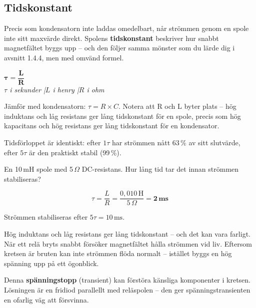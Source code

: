 \documentclass[a4paper,11pt,twoside]{book}
\newcommand{\emoji}[1]{{\emojifont #1}}
\begin{document}
\subsection{Tidskonstant}

Precis som kondensatorn inte laddas omedelbart, når 
strömmen genom en spole inte sitt maxvärde direkt. 
Spolens \textbf{tidskonstant} beskriver hur snabbt 
magnetfältet byggs upp -- och den följer samma mönster 
som du lärde dig i avsnitt 1.4.4, men med omvänd formel.

\begin{formulabox}
{\large$\mathbf{\tau = \dfrac{L}{R}}$}\\[3mm]
{\small\normalfont\itshape $\tau$ i sekunder \quad|\quad $L$ i henry \quad|\quad $R$ i ohm}
\end{formulabox}

Jämför med kondensatorn: $\tau = R \times C$. Notera 
att R och L byter plats -- hög induktans och låg 
resistans ger lång tidskonstant för en spole, precis 
som hög kapacitans och hög resistans ger lång 
tidskonstant för en kondensator.

Tidsförloppet är identiskt: efter $1\tau$ har strömmen 
nått 63\,\% av sitt slutvärde, efter $5\tau$ är den 
praktiskt stabil (99\,\%).

\begin{worked}[title={Räkneexempel 1.5.5-1 -- Spole i krets}]
En 10\,mH spole med 5\,$\Omega$ DC-resistans. 
Hur lång tid tar det innan strömmen stabiliseras?

\[ \tau = \frac{L}{R} = \frac{0{,}010\,\text{H}}{5\,\Omega} = \mathbf{2\,\text{ms}} \]

Strömmen stabiliseras efter $5\tau = 10\,\text{ms}$.
\end{worked}

\begin{orangebox}[title={\emoji{⚡} Reläspolar och spänningstransienter}]
Hög induktans och låg resistans ger lång tidskonstant 
-- och det kan vara farligt. När ett relä bryts snabbt 
försöker magnetfältet hålla strömmen vid liv. Eftersom 
kretsen är bruten kan inte strömmen flöda normalt -- 
istället byggs en hög spänning upp på ett ögonblick. 

Denna \textbf{spänningstopp} (transient) kan förstöra 
känsliga komponenter i kretsen. Lösningen är en 
fridiod parallellt med reläspolen -- den ger 
spänningstransienten en ofarlig väg att försvinna.
\end{orangebox}
\end{document}
